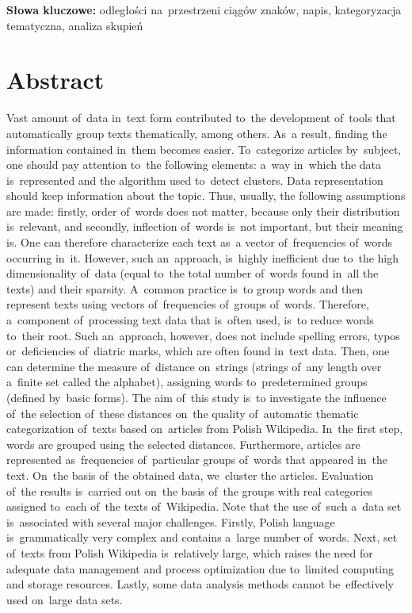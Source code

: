 \documentclass{praca1}
\begin{document}
\textbf{Słowa kluczowe:} odległości na~przestrzeni ciągów znaków, napis, kategoryzacja tematyczna, analiza skupień

\newpage

\section*{Abstract}

Vast amount of~data in~text form contributed to~the development of~tools that automatically group texts thematically, among others. As~a result, finding the information contained in~them becomes easier. To~categorize articles by~subject, one should pay attention to~the following elements: a~way in~which the data is~represented and the algorithm used to~detect clusters. Data representation should keep information about the topic. Thus, usually, the following assumptions are made: firstly, order of~words does not matter, because only their distribution is~relevant, and secondly, inflection of~words is~not important, but their meaning is. One can therefore characterize each text as~a vector of~frequencies of~words occurring in~it. However, such an~approach, is~highly inefficient due to~the high dimensionality of~data (equal to~the total number of~words found in~all the texts) and their sparsity. A~common practice is~to group words and then represent texts using vectors of~frequencies of~groups of~words. Therefore, a~component of~processing text data that is~often used, is~to reduce words to~their root. Such an~approach, however, does not include spelling errors, typos or~deficiencies of~diatric marks, which are often found in~text data. Then, one can determine the measure of~distance on~strings (strings of~any length over a~finite set called the alphabet), assigning words to~predetermined groups (defined by~basic forms). The aim of~this study is~to investigate the influence of~the selection of~these distances on~the quality of~automatic thematic categorization of~texts based on~articles from Polish Wikipedia. In~the first step, words are grouped using the selected distances. Furthermore, articles are represented as~frequencies of~particular groups of~words that appeared in~the text. On~the basis of~the obtained data, we~cluster the articles. Evaluation of~the results is~carried out on~the basis of~the groups with real categories assigned to~each of~the texts of~Wikipedia. Note that the use of~such a~data set is~associated with several major challenges. Firstly,  Polish language is~grammatically very complex and contains a~large number of~words. Next, set of~texts from Polish Wikipedia is~relatively large, which raises the need for adequate data management and process optimization due to~limited computing and storage resources. Lastly, some data analysis methods cannot be~effectively used on~large data sets.
\end{document}
